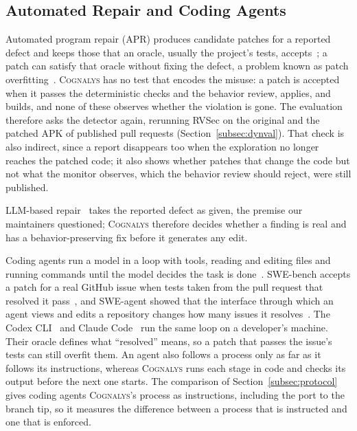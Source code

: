 \documentclass[conference]{IEEEtran}
\newcommand{\system}{\textsc{Cognalys}}
\begin{document}
\subsection{Automated Repair and Coding Agents}
\label{subsec:apr}

Automated program repair (APR) produces candidate patches for a reported
defect and keeps those that an oracle, usually the project's tests,
accepts~\cite{legoues2019apr}; a patch can satisfy that oracle without fixing
the defect, a problem known as patch
overfitting~\cite{smith2015overfitting}. \system{} has no test that encodes
the misuse: a patch is accepted when it passes the deterministic checks and
the behavior review, applies, and builds, and none of these observes whether
the violation is gone. The evaluation therefore asks the detector again,
rerunning RVSec on the original and the patched APK of published pull requests
(Section~\ref{subsec:dynval}). That check is also indirect, since a report
disappears too when the exploration no longer reaches the patched code; it
also shows whether patches that change the code but not what the monitor
observes, which the behavior review should reject, were still published.

LLM-based repair~\cite{xia2023apr,zhang2023apimisuse} takes the reported
defect as given, the premise our maintainers questioned; \system{} therefore
decides whether a finding is real and has a behavior-preserving fix before it
generates any edit.

Coding agents run a model in a loop with tools, reading and editing files and
running commands until the model decides the task is
done~\cite{yang2024sweagent}. SWE-bench accepts a patch for a real GitHub issue
when tests taken from the pull request that resolved it
pass~\cite{jimenez2024swebench}, and SWE-agent showed that the interface
through which an agent views and edits a repository changes how many issues it
resolves~\cite{yang2024sweagent}. The Codex CLI~\cite{openai2026codex} and
Claude Code~\cite{anthropic2026claudecode} run the same loop on a developer's
machine. Their oracle defines what ``resolved'' means, so a patch that passes
the issue's tests can still overfit them. An agent also follows a process only
as far as it follows its instructions, whereas \system{} runs each stage in code and checks its output
before the next one starts. The comparison of Section~\ref{subsec:protocol}
gives coding agents \system{}'s process as instructions, including the port to
the branch tip, so it measures the difference between a process that is
instructed and one that is enforced.
\end{document}
